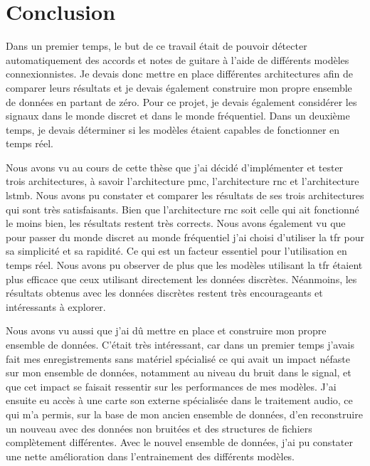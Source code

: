 \chapter*{Conclusion}

Dans un premier temps, le but de ce travail était de pouvoir détecter automatiquement des accords et notes de guitare à l'aide de différents modèles connexionnistes. Je devais donc mettre en place différentes architectures afin de comparer leurs résultats et je devais également construire mon propre ensemble de données en partant de zéro. Pour ce projet, je devais également considérer les signaux dans le monde discret et dans le monde fréquentiel. Dans un deuxième temps, je devais déterminer si les modèles étaient capables de fonctionner en temps réel.

Nous avons vu au cours de cette thèse que j'ai décidé d'implémenter et tester trois architectures, à savoir l'architecture \gls{pmc}, l'architecture \gls{rnc} et l'architecture \gls{lstmb}. Nous avons pu constater et comparer les résultats de ses trois architectures qui sont très satisfaisants. Bien que l'architecture \gls{rnc} soit celle qui ait fonctionné le moins bien, les résultats restent très corrects. Nous avons également vu que pour passer du monde discret au monde fréquentiel j'ai choisi d'utiliser la \gls{tfr} pour sa simplicité et sa rapidité. Ce qui est un facteur essentiel pour l'utilisation en temps réel. Nous avons pu observer de plus que les modèles utilisant la \gls{tfr} étaient plus efficace que ceux utilisant directement les données discrètes. Néanmoins, les résultats obtenus avec les données discrètes restent très encourageants et intéressants à explorer.

Nous avons vu aussi que j'ai dû mettre en place et construire mon propre ensemble de données. C'était très intéressant, car dans un premier temps j'avais fait mes enregistrements sans matériel spécialisé ce qui avait un impact néfaste sur mon ensemble de données, notamment au niveau du bruit dans le signal, et que cet impact se faisait ressentir sur les performances de mes modèles. J'ai ensuite eu accès à une carte son externe spécialisée dans le traitement audio, ce qui m'a permis, sur la base de mon ancien ensemble de données, d'en reconstruire un nouveau avec des données non bruitées et des structures de fichiers complètement différentes. Avec le nouvel ensemble de données, j'ai pu constater une nette amélioration dans l'entrainement des différents modèles.

